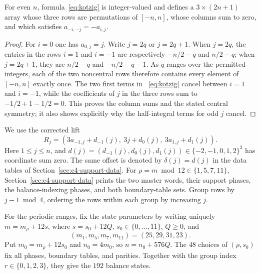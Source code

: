 \begin{lemma}\label{lem:even-kotzig}
For even $n$, formula~\eqref{eq:kotzig} is integer-valued and defines a $3\times(2n+1)$
array whose three rows are permutations of $[-n,n]$, whose columns sum to zero, and which satisfies
$a_{-i,-j}=-a_{i,j}$.
\end{lemma}
\begin{proof}
For $i=0$ one has $a_{0,j}=j$.  Write $j=2q$ or $j=2q+1$.  When $j=2q$, the entries in
the rows $i=1$ and $i=-1$ are respectively $-n/2-q$ and $n/2-q$; when $j=2q+1$, they are
$n/2-q$ and $-n/2-q-1$.  As $q$ ranges over the permitted integers, each of the two noncentral
rows therefore contains every element of $[-n,n]$ exactly once.  The two first terms in
~\eqref{eq:kotzig} cancel between $i=1$ and $i=-1$, while the coefficients of $j$ in the three
rows sum to $-1/2+1-1/2=0$.  This proves the column sums and the stated central symmetry; it also
shows explicitly why the half-integral terms for odd $j$ cancel.
\end{proof}

We use the corrected lift
\begin{equation}\label{eq:c4lift}
R_j=(3a_{-1,j}+d_{-1}(j),\ 3j+d_0(j),\ 3a_{1,j}+d_1(j)).
\end{equation}
Here $1\le j\le n$, and $d(j)=(d_{-1}(j),d_0(j),d_1(j))\in\{-2,-1,0,1,2\}^3$
has coordinate sum zero. The same offset is denoted by $\delta(j)=d(j)$ in the data tables of
Section~\ref{sec:c4-support-data}.
For $\rho=m\bmod12\in\{1,5,7,11\}$, Section~\ref{sec:c4-support-data} prints the two master
words, their support phases, the balance-indexing phases, and both boundary-table sets.
Group rows by $j-1\bmod4$, ordering the rows within each group by increasing $j$.

For the periodic ranges, fix the state parameters by writing uniquely
$m=m_\rho+12s$, where $s=s_0+12Q$, $s_0\in\{0,\ldots,11\}$, $Q\ge0$, and
\[
(m_1,m_5,m_7,m_{11})=(25,29,31,23).
\]
Put $m_0=m_\rho+12s_0$ and $n_0=4m_0$, so $n=n_0+576Q$.
The $48$ choices of $(\rho,s_0)$ fix all phases, boundary tables, and parities.
Together with the group index $r\in\{0,1,2,3\}$, they give the $192$ balance states.

